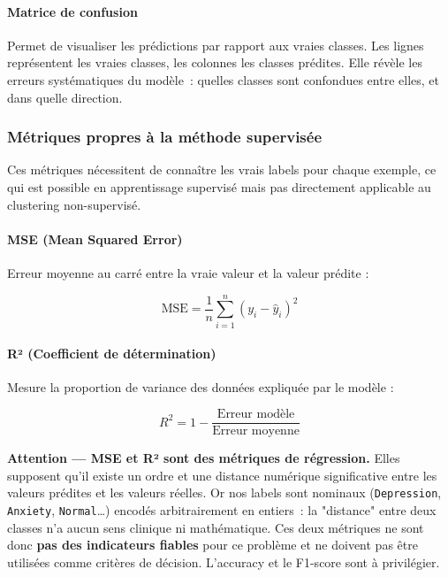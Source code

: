 \documentclass[12pt,a4paper]{article}
\begin{document}
\paragraph{Matrice de confusion}

Permet de visualiser les prédictions par rapport aux vraies classes. Les lignes représentent les vraies classes, les colonnes les classes prédites. Elle révèle les erreurs systématiques du modèle~: quelles classes sont confondues entre elles, et dans quelle direction.

\subsubsection{Métriques propres à la méthode supervisée}

Ces métriques nécessitent de connaître les vrais labels pour chaque exemple, ce qui est possible en apprentissage supervisé mais pas directement applicable au clustering non-supervisé.

\paragraph{MSE (Mean Squared Error)}

Erreur moyenne au carré entre la vraie valeur et la valeur prédite :

\[
  \text{MSE} = \frac{1}{n}\sum_{i=1}^{n}(y_i - \hat{y}_i)^2
\]

\paragraph{R² (Coefficient de détermination)}

Mesure la proportion de variance des données expliquée par le modèle :

\[
  R^2 = 1 - \frac{\text{Erreur modèle}}{\text{Erreur moyenne}}
\]

\begin{avertissement}
\textbf{Attention --- MSE et R² sont des métriques de régression.} Elles supposent qu'il existe un ordre et une distance numérique significative entre les valeurs prédites et les valeurs réelles. Or nos labels sont nominaux (\texttt{Depression}, \texttt{Anxiety}, \texttt{Normal}\ldots) encodés arbitrairement en entiers~: la "distance" entre deux classes n'a aucun sens clinique ni mathématique. Ces deux métriques ne sont donc \textbf{pas des indicateurs fiables} pour ce problème et ne doivent pas être utilisées comme critères de décision. L'accuracy et le F1-score sont à privilégier.
\end{avertissement}
\end{document}
